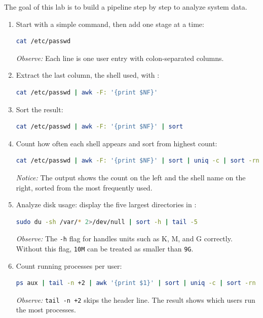 The goal of this lab is to build a pipeline step by step to analyze system data.

\begin{enumerate}
    \item Start with a simple command, then add one stage at a time:
\begin{lstlisting}[language=bash, caption={Step-by-step pipeline: count users per shell}]
cat /etc/passwd
\end{lstlisting}
    \textit{Observe:} Each line is one user entry with colon-separated columns.

    \item Extract the last column, the shell used, with :
\begin{lstlisting}[language=bash, caption={Extracting the shell column from /etc/passwd}]
cat /etc/passwd | awk -F: '{print $NF}'
\end{lstlisting}

    \item Sort the result:
\begin{lstlisting}[language=bash, caption={Sorting the shell list}]
cat /etc/passwd | awk -F: '{print $NF}' | sort
\end{lstlisting}

    \item Count how often each shell appears and sort from highest count:
\begin{lstlisting}[language=bash, caption={Counting each shell occurrence}]
cat /etc/passwd | awk -F: '{print $NF}' | sort | uniq -c | sort -rn
\end{lstlisting}
    \textit{Notice:} The output shows the count on the left and the shell name on the right, sorted from the most frequently used.

    \item Analyze disk usage: display the five largest directories in :
\begin{lstlisting}[language=bash, caption={Five largest directories in /var}]
sudo du -sh /var/* 2>/dev/null | sort -h | tail -5
\end{lstlisting}
    \textit{Observe:} The \texttt{-h} flag for  handles units such as K, M, and G correctly. Without this flag, \texttt{10M} can be treated as smaller than \texttt{9G}.

    \item Count running processes per user:
\begin{lstlisting}[language=bash, caption={Process count per user}]
ps aux | tail -n +2 | awk '{print $1}' | sort | uniq -c | sort -rn
\end{lstlisting}
    \textit{Observe:} \texttt{tail -n +2} skips the  header line. The result shows which users run the most processes.
\end{enumerate}

